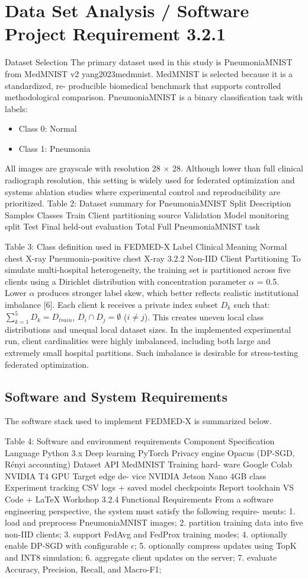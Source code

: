 \documentclass[12pt,a4paper]{report}
\begin{document}
\section{Data Set Analysis / Software Project Requirement 3.2.1}
Dataset Selection
The primary dataset used in this study is PneumoniaMNIST from MedMNIST v2 yang2023medmnist.
MedMNIST is selected because it is a standardized, re- producible biomedical benchmark that supports controlled methodological comparison.
PneumoniaMNIST is a binary classification task with labels:
\begin{itemize}
\item Class 0: Normal
\item Class 1: Pneumonia
\end{itemize}
All images are grayscale with resolution 28 × 28. Although lower than full clinical radiograph resolution, this setting is widely used for federated optimization and systems ablation studies where experimental control and reproducibility are prioritized.
Table 2: Dataset summary for PneumoniaMNIST
Split
Description
Samples
Classes
Train
Client partitioning source
Validation
Model monitoring split
Test
Final held-out evaluation
Total
Full PneumoniaMNIST task

Table 3: Class definition used in FEDMED-X
Label
Clinical Meaning
Normal chest X-ray
Pneumonia-positive chest X-ray 3.2.2
Non-IID Client Partitioning
To simulate multi-hospital heterogeneity, the training set is partitioned across five clients using a Dirichlet distribution with concentration parameter $\alpha$ = 0.5. Lower $\alpha$ produces stronger label skew, which better reflects realistic institutional imbalance [6].
Each client k receives a private index subset $D_k$ such that:
$\sum_{k=1}^5 D_k = D_{train}$,
$D_i \cap D_j = \emptyset$ ($i \neq j$).
This creates uneven local class distributions and unequal local dataset sizes. In the implemented experimental run, client cardinalities were highly imbalanced, including both large and extremely small hospital partitions. Such imbalance is desirable for stress-testing federated optimization.
\subsection{Software and System Requirements}
The software stack used to implement FEDMED-X is summarized below.

Table 4: Software and environment requirements
Component
Specification
Language
Python 3.x
Deep learning
PyTorch
Privacy engine
Opacus (DP-SGD, Rényi accounting)
Dataset API
MedMNIST
Training hard- ware
Google Colab NVIDIA T4 GPU
Target edge de- vice
NVIDIA Jetson Nano 4GB class
Experiment tracking
CSV logs + saved model checkpoints
Report toolchain
VS Code + LaTeX Workshop 3.2.4
Functional Requirements
From a software engineering perspective, the system must satisfy the following require- ments:
1. load and preprocess PneumoniaMNIST images; 2. partition training data into five non-IID clients; 3. support FedAvg and FedProx training modes; 4. optionally enable DP-SGD with configurable $\epsilon$; 5. optionally compress updates using TopK and INT8 simulation; 6. aggregate client updates on the server; 7. evaluate Accuracy, Precision, Recall, and Macro-F1;
\end{document}
